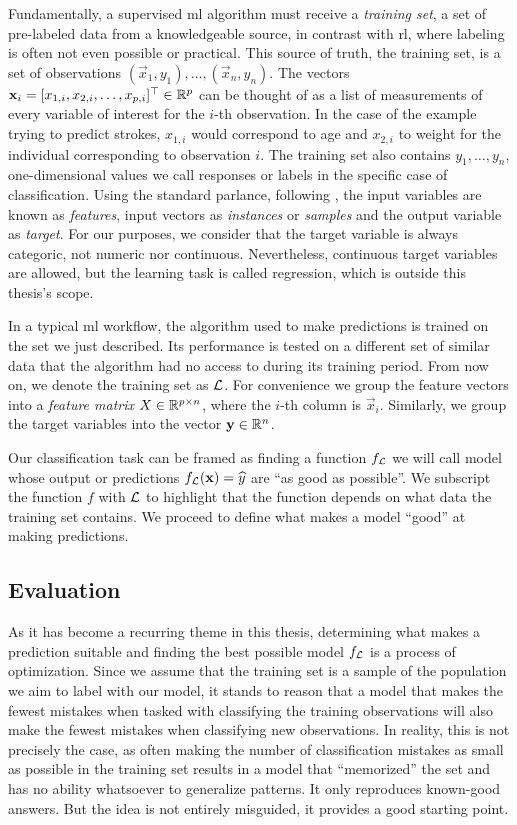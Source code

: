 Fundamentally, a supervised \ac{ml} algorithm must receive a \textit{training
set}, a set of pre-labeled data from a knowledgeable source, in contrast with
\ac{rl}, where labeling is often not even possible or practical. This source of
truth, the training set, is a set of observations $(\vec{x}_1, y_1), \dots,
(\vec{x}_n, y_n)$. The vectors $\mathbf{x}_i = [x_{1, i}, x_{2, i}, \dots, x_{p,
i}]^{\top} \in \mathbb{R}^{p}$ can be thought of as a list of measurements of every
variable of interest for the $i$-th observation. In the case of the example
trying to predict strokes, $x_{1, i}$ would correspond to age and $x_{2, i}$ to
weight for the individual corresponding to observation $i$. The training set
also contains $y_1, \dots, y_n$, one-dimensional values we call responses or
labels in the specific case of classification. Using the standard parlance,
following \cite{louppe2014}, the input variables are known as \textit{features},
input vectors as \textit{instances} or \textit{samples} and the output variable
as \textit{target}. For our purposes, we consider that the target variable is
always categoric, not numeric nor continuous. Nevertheless, continuous target
variables are allowed, but the learning task is called regression, which is
outside this thesis's scope.

In a typical \ac{ml} workflow, the algorithm used to make predictions is trained
on the set we just described. Its performance is tested on a different set of
similar data that the algorithm had no access to during its training period.
From now on, we denote the training set as $\mathcal{L}$. For convenience we group the
feature vectors into a \textit{feature matrix} $X \in \mathbb{R}^{p \times n}$, where
the $i$-th column is $\vec{x}_i$. Similarly, we group the target variables into
the vector $\mathbf{y} \in \mathbb{R}^{n}$.

Our classification task can be framed as finding a function $f_{\mathcal{L}}$ we will
call model whose output or predictions $f_{\mathcal{L}} (\mathbf{x}) = \widehat{y}$
are ``as good as possible''. We subscript the function $f$ with $\mathcal{L}$ to
highlight that the function depends on what data the training set contains. We
proceed to define what makes a model ``good'' at making predictions.

\subsection{Evaluation}

As it has become a recurring theme in this thesis, determining what makes a
prediction suitable and finding the best possible model $f_{\mathcal{L}}$ is a process of
optimization. Since we assume that the training set is a sample of the
population we aim to label with our model, it stands to reason that a model that
makes the fewest mistakes when tasked with classifying the training observations
will also make the fewest mistakes when classifying new observations. In
reality, this is not precisely the case, as often making the number of
classification mistakes as small as possible in the training set results in a
model that ``memorized'' the set and has no ability whatsoever to generalize
patterns. It only reproduces known-good answers. But the idea is not entirely
misguided, it provides a good starting point.

